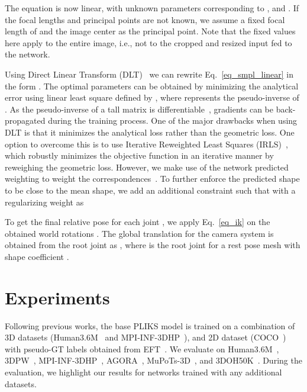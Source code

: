 \documentclass[10pt,twocolumn,letterpaper]{article}
\begin{document}
The equation is now linear, with  unknown parameters corresponding to ,  and . If the focal lengths  and principal points  are not known, we assume a fixed focal length of  and the image center as the principal point. Note that the fixed values here apply to the entire image, i.e., not to the cropped and resized input fed to the network.  


Using Direct Linear Transform (DLT)~\cite{dlt} we can rewrite Eq.~\eqref{eq_smpl_linear} in the form . The optimal parameters can be obtained by minimizing the analytical error using linear least square defined by , where  represents the pseudo-inverse of . As the pseudo-inverse of a tall matrix is differentiable~\cite{pinv}, gradients can be back-propagated during the training process. One of the major drawbacks when using DLT is that it minimizes the analytical loss rather than the geometric loss. One option to overcome this is to use Iterative Reweighted Least Squares (IRLS)~\cite{irls}, which robustly minimizes the objective function in an iterative manner by reweighing the geometric loss. However, we make use of the network predicted weighting  to weight the correspondences~\cite{lookma,dfm}. To further enforce the predicted shape to be close to the mean shape, we add an additional constraint such that  with a  regularizing weight  as


To get the final relative pose  for each joint , we apply Eq.~\eqref{eq_ik} on the obtained world rotations . The global translation for the camera system  is obtained from the root joint as , where  is the root joint for a rest pose mesh with shape coefficient .










\section{Experiments}
Following previous works, the base PLIKS model is trained on a combination of 3D datasets (Human3.6M~\cite{h36m} and MPI-INF-3DHP~\cite{mpiinf}), and 2D dataset (COCO~\cite{coco}) with pseudo-GT labels obtained from EFT~\cite{eft}. We evaluate on Human3.6M~\cite{h36m}, 3DPW~\cite{3dpw}, MPI-INF-3DHP~\cite{mpiinf}, AGORA~\cite{agora}, MuPoTs-3D~\cite{mupo}, and 3DOH50K~\cite{3doh}. During the evaluation, we highlight our results for networks trained with any additional datasets.
\end{document}
